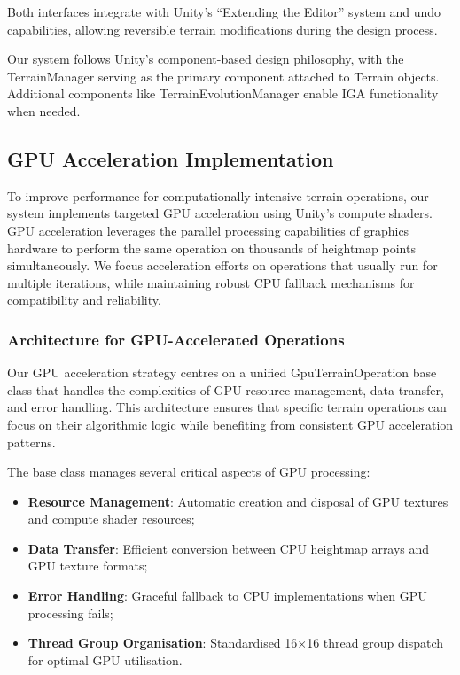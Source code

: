 Both interfaces integrate with Unity's ``Extending the Editor'' \citep{UnityEditor} system and undo capabilities, allowing reversible terrain modifications during the design process.

Our system follows Unity's component-based design philosophy, with the \textsf{TerrainManager} serving as the primary component attached to Terrain objects. Additional components like \textsf{TerrainEvolutionManager} enable IGA functionality when needed.


\subsection{GPU Acceleration Implementation}
\label{Gpu_acceleration_2}

To improve performance for computationally intensive terrain operations, our system implements targeted GPU acceleration using Unity's compute shaders. GPU acceleration leverages the parallel processing capabilities of graphics hardware to perform the same operation on thousands of heightmap points simultaneously. We focus acceleration efforts on operations that usually run for multiple iterations, while maintaining robust CPU fallback mechanisms for compatibility and reliability.

\subsubsection{Architecture for GPU-Accelerated Operations}

Our GPU acceleration strategy centres on a unified \textsf{GpuTerrainOperation} base class that handles the complexities of GPU resource management, data transfer, and error handling. This architecture ensures that specific terrain operations can focus on their algorithmic logic while benefiting from consistent GPU acceleration patterns.

The base class manages several critical aspects of GPU processing:

\begin{itemize}
    \item \textbf{Resource Management}: Automatic creation and disposal of GPU textures and compute shader resources;
    \item \textbf{Data Transfer}: Efficient conversion between CPU heightmap arrays and GPU texture formats;
    \item \textbf{Error Handling}: Graceful fallback to CPU implementations when GPU processing fails;
    \item \textbf{Thread Group Organisation}: Standardised 16×16 thread group dispatch for optimal GPU utilisation.
\end{itemize}

